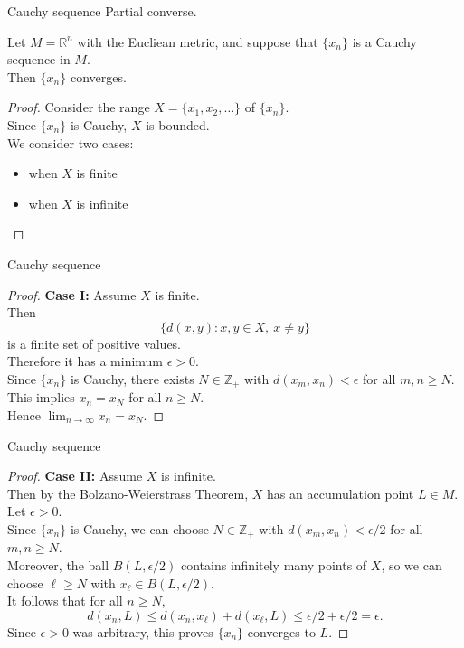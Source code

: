 \documentclass{beamer}
\begin{document}
\begin{frame}{Cauchy sequence}
Partial converse.
\pause
\begin{thm}
Let $M=\mathbb R^n$ with the Eucliean metric, and suppose that $\{x_n\}$ is a Cauchy sequence in $M$.\\
Then $\{x_n\}$ converges.
\end{thm}
\pause
\begin{proof}
\pause
Consider the range $X = \{x_1,x_2,\dots\}$ of $\{x_n\}$.\\
\pause
Since $\{x_n\}$ is Cauchy, $X$ is bounded.\\
\pause
We consider two cases:
\begin{itemize}
\pause
\item when $X$ is finite
\pause
\item when $X$ is infinite
\end{itemize}
\end{proof}
\end{frame}

\begin{frame}{Cauchy sequence}
\begin{proof}
\textbf{Case I:} Assume $X$ is finite.\\
\pause
Then
$$\{d(x,y): x,y\in X,\ x\neq y\}$$
is a finite set of positive values.\\
\pause
Therefore it has a minimum $\epsilon > 0$.\\
\pause
Since $\{x_n\}$ is Cauchy, there exists $N\in\mathbb{Z}_+$ with $d(x_m,x_n) < \epsilon$ for all $m,n \geq N$.\\
\pause
This implies $x_n = x_N$ for all $n\geq N$.\\
\pause
Hence $\lim_{n\rightarrow\infty} x_n = x_N$.
\end{proof}
\end{frame}

\begin{frame}{Cauchy sequence}
\begin{proof}
\textbf{Case II:} Assume $X$ is infinite.\\
\pause
Then by the Bolzano-Weierstrass Theorem, $X$ has an accumulation point $L\in M$.\\
\pause
Let $\epsilon > 0$.\\
\pause
Since $\{x_n\}$ is Cauchy, we can choose $N\in\mathbb{Z}_+$ with $d(x_m,x_n) < \epsilon/2$ for all $m,n\geq N$.\\
\pause
Moreover, the ball $B(L,\epsilon /2)$ contains infinitely many points of $X$, so we can choose $\ell\geq N$ with $x_\ell\in B(L,\epsilon/2)$.\\
\pause
It follows that for all $n\geq N$,
$$d(x_n,L)\leq d(x_n,x_\ell) + d(x_\ell,L) \leq \epsilon/2 + \epsilon/2 = \epsilon.$$
\pause
Since $\epsilon > 0$ was arbitrary, this proves $\{x_n\}$ converges to $L$.
\end{proof}
\end{frame}
\end{document}
